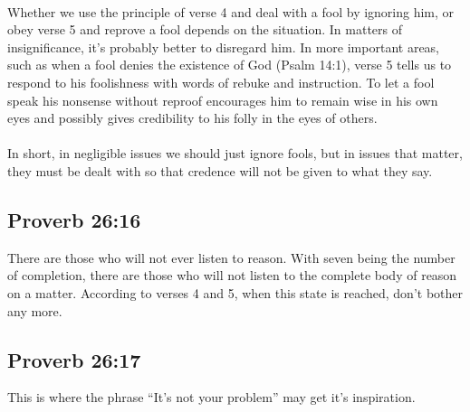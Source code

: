 \\
Whether we use the principle of verse 4 and deal with a fool by ignoring him, or obey verse 5 and reprove a fool depends on the situation. In matters of insignificance, it's probably better to disregard him. In more important areas, such as when a fool denies the existence of God (Psalm 14:1), verse 5 tells us to respond to his foolishness with words of rebuke and instruction. To let a fool speak his nonsense without reproof encourages him to remain wise in his own eyes and possibly gives credibility to his folly in the eyes of others.\\
\\
In short, in negligible issues we should just ignore fools, but in issues that matter, they must be dealt with so that credence will not be given to what they say. %

\subsection{Proverb 26:16}
There are those who will not ever listen to reason. With seven being the number of completion, there are those who will not listen to the complete body of reason on a matter. According to verses 4 and 5, when this state is reached, don't bother any more. %

\subsection{Proverb 26:17}
This is where the phrase ``It's not your problem'' may get it's inspiration.

